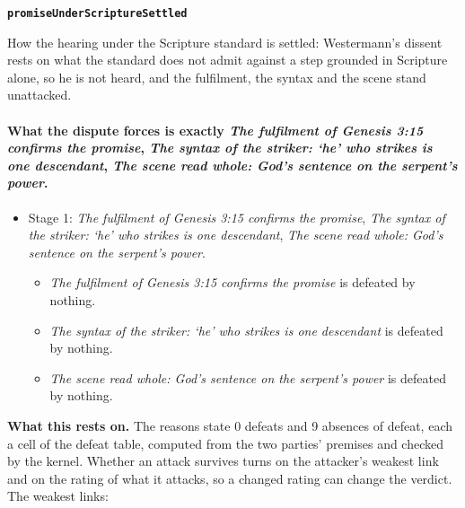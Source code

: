 \documentclass[11pt]{article}
\begin{document}
\par\medskip\noindent\textbf{\texttt{promise\allowbreak{}Under\allowbreak{}Scripture\allowbreak{}Settled}}\par\nobreak\noindent
How the hearing under the Scripture standard is settled: Westermann’s dissent rests on what the standard does not admit against a step grounded in Scripture alone, so he is not heard, and the fulfilment, the syntax and the scene stand unattacked.

\paragraph{What the dispute forces is exactly \emph{The fulfilment of Genesis 3:15 confirms the promise}, \emph{The syntax of the striker: ‘he’ who strikes is one descendant}, \emph{The scene read whole: God’s sentence on the serpent’s power}.}
\begin{itemize}
\item Stage 1: \emph{The fulfilment of Genesis 3:15 confirms the promise}, \emph{The syntax of the striker: ‘he’ who strikes is one descendant}, \emph{The scene read whole: God’s sentence on the serpent’s power}.
\begin{itemize}
\item \emph{The fulfilment of Genesis 3:15 confirms the promise} is defeated by nothing.
\item \emph{The syntax of the striker: ‘he’ who strikes is one descendant} is defeated by nothing.
\item \emph{The scene read whole: God’s sentence on the serpent’s power} is defeated by nothing.
\end{itemize}
\end{itemize}
\par\noindent\textbf{What this rests on.} The reasons state 0 defeats and 9 absences of defeat, each a cell of the defeat table, computed from the two parties' premises and checked by the kernel. Whether an attack survives turns on the attacker's weakest link and on the rating of what it attacks, so a changed rating can change the verdict. The weakest links:
\end{document}
